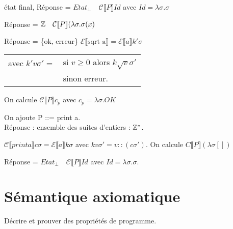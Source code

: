 \documentclass[10pt,a4paper]{article}
\newcommand{\E}{\mathcal{E}}
\newcommand{\semm}[1]{\llbracket #1 \rrbracket }
\begin{document}
\begin{ex}[1] état final, Réponse = $Etat_{\perp} \quad \mathcal{C}\semm{P} Id$ avec $Id = \lambda \sigma . \sigma$
\end{ex}
\begin{ex}[2]  Réponse = $\Zs \quad \mathcal{C}\semm{P} ( \lambda \sigma . \sigma(x)$
\end{ex}
\begin{ex}[3]  Réponse = \{ok, erreur\} $\E\semm{\text{sqrt a}} = \E\semm{a} k' \sigma$ \\
\begin{tabular}{ll}
 avec $k' v \sigma' = $ & si $v \geq 0$ alors $ k \sqrt{v} \sigma'$\\
  & sinon erreur.\\
\end{tabular}
On calcule $\mathcal{C}\semm{P} c_p$ avec $c_p = \lambda \sigma . OK$
\end{ex}
\begin{ex}[4 : affichage] On ajoute P ::= print a.\\
Réponse : ensemble des suites d'entiers : $\mathbb{Z}^*$.

$\mathcal{C}\semm{print a} c \sigma = \E\semm{a} k \sigma$ avec $k v \sigma' = v::(c \sigma')$.
On calcule ${C}\semm{P} (\lambda \sigma [])$

 Réponse = $Etat_{\perp} \quad \mathcal{C}\semm{P} Id$ avec $Id = \lambda \sigma . \sigma$.
\end{ex}



\part{Sémantique axiomatique}

Décrire et prouver des propriétés de programme.
\end{document}
